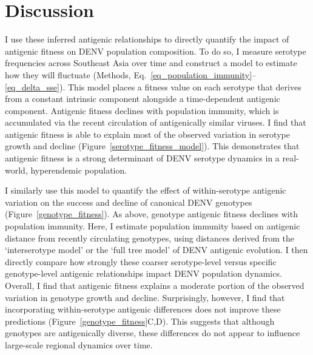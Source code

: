 
\section{Discussion}
I use these inferred antigenic relationships to directly quantify the impact of antigenic fitness on DENV population composition.
To do so, I measure serotype frequencies across Southeast Asia over time and construct a model to estimate how they will fluctuate (Methods, Eq.~\ref{eq_population_immunity}--\ref{eq_delta_sse}).
This model places a fitness value on each serotype that derives from a constant intrinsic component alongside a time-dependent antigenic component.
Antigenic fitness declines with population immunity, which is accumulated via the recent circulation of antigenically similar viruses.
I find that antigenic fitness is able to explain most of the observed variation in serotype growth and decline (Figure~\ref{serotype_fitness_model}).
This demonstrates that antigenic fitness is a strong determinant of DENV serotype dynamics in a real-world, hyperendemic population.

I similarly use this model to quantify the effect of within-serotype antigenic variation on the success and decline of canonical DENV genotypes (Figure~\ref{genotype_fitness}).
As above, genotype antigenic fitness declines with population immunity.
Here, I estimate population immunity based on antigenic distance from recently circulating genotypes, using distances derived from the `interserotype model' or the `full tree model' of DENV antigenic evolution.
I then directly compare how strongly these coarser serotype-level versus specific genotype-level antigenic relationships impact DENV population dynamics.
Overall, I find that antigenic fitness explains a moderate portion of the observed variation in genotype growth and decline.
Surprisingly, however, I find that incorporating within-serotype antigenic differences does not improve these predictions (Figure~\ref{genotype_fitness}C,D).
This suggests that although genotypes are antigenically diverse, these differences do not appear to influence large-scale regional dynamics over time.

